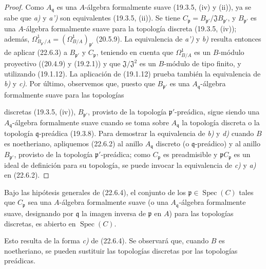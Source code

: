 \begin{proof}
Como $A_{\mathfrak q}$ es una $A$-álgebra formalmente suave (19.3.5, (iv)
y (ii)), ya se sabe que \emph{a)} y \emph{a')} son equivalentes (19.3.5, (ii)). Se tiene
$C_{\mathfrak p}=B_{\mathfrak p'}/\mathfrak J B_{\mathfrak p'}$, y
$B_{\mathfrak p'}$ es una $A$-álgebra formalmente suave para la topología
discreta (19.3.5, (iv)); además,
$\Omega^1_{B_{\mathfrak p'}/A}=(\Omega^1_{B/A})_{\mathfrak p'}$ (20.5.9).
La equivalencia de \emph{a')} y \emph{b)} resulta entonces de aplicar (22.6.3) a
$B_{\mathfrak p'}$ y $C_{\mathfrak p}$, teniendo en cuenta que
$\Omega^1_{B/A}$ es un $B$-módulo proyectivo ((20.4.9) y (19.2.1)) y que
$\mathfrak J/\mathfrak J^2$ es un $B$-módulo de tipo finito, y utilizando
(19.1.12). La aplicación de (19.1.12) prueba también la equivalencia de \emph{b)} y \emph{c)}.
Por último, observemos que, puesto que $B_{\mathfrak p'}$ es una
$A_{\mathfrak q}$-álgebra formalmente suave para las topologías


discretas (19.3.5, (iv)), $B_{\mathfrak p'}$, provisto de la topología
$\mathfrak p'$-preádica, sigue siendo una $A_{\mathfrak q}$-álgebra
formalmente suave cuando se toma sobre $A_{\mathfrak q}$ la topología
discreta o la topología $\mathfrak q$-preádica (19.3.8). Para demostrar
la equivalencia de \emph{b)} y \emph{d)} cuando $B$ es noetheriano, apliquemos (22.6.2) al
anillo $A_{\mathfrak q}$ discreto (o $\mathfrak q$-preádico) y al anillo
$B_{\mathfrak p'}$, provisto de la topología $\mathfrak p'$-preádica; como
$C_{\mathfrak p}$ es preadmisible y $\mathfrak pC_{\mathfrak p}$ es
un ideal de definición para su topología, se puede invocar la equivalencia de
\emph{c)} y \emph{a)} en (22.6.2).
\end{proof}

\begin{corollary}[22.6.5]
\label{0.22.6.5-fr}
Bajo las hipótesis generales de (22.6.4), el conjunto de los
$\mathfrak p\in\operatorname{Spec}(C)$ tales que $C_{\mathfrak p}$ sea una $A$-álgebra
formalmente suave \textup{(o una $A_{\mathfrak q}$-álgebra formalmente suave, designando
por $\mathfrak q$ la imagen inversa de $\mathfrak p$ en $A$)}
para las topologías discretas, es abierto en $\operatorname{Spec}(C)$.
\end{corollary}

Esto resulta de la forma \emph{c)} de (22.6.4). Se observará que, cuando $B$ es
noetheriano, se pueden sustituir las topologías discretas por las topologías
preádicas.

